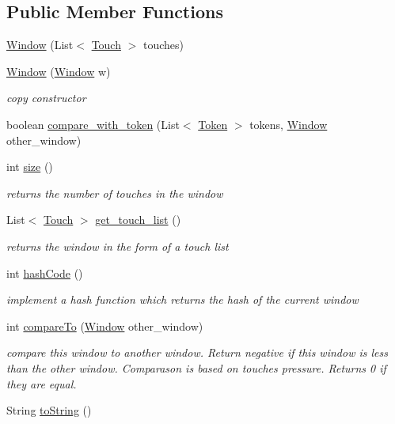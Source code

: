 \subsection*{Public Member Functions}
\begin{DoxyCompactItemize}
\item 
\hyperlink{classcomponents_1_1_window_a7ca5acd9fe649949cb0adccc837cf9d2}{Window} (List$<$ \hyperlink{classcomponents_1_1_touch}{Touch} $>$ touches)
\item 
\hyperlink{classcomponents_1_1_window_a5869fe4e3c5d711af934ff83114e55aa}{Window} (\hyperlink{classcomponents_1_1_window}{Window} w)
\begin{DoxyCompactList}\small\item\em copy constructor \end{DoxyCompactList}\item 
boolean \hyperlink{classcomponents_1_1_window_a3453a892128b5b4bded8bb7d18bbf35f}{compare\+\_\+with\+\_\+token} (List$<$ \hyperlink{classcomponents_1_1_token}{Token} $>$ tokens, \hyperlink{classcomponents_1_1_window}{Window} other\+\_\+window)
\item 
int \hyperlink{classcomponents_1_1_window_ab553fd43fb0240c0ef8a2218bdd5092c}{size} ()
\begin{DoxyCompactList}\small\item\em returns the number of touches in the window \end{DoxyCompactList}\item 
List$<$ \hyperlink{classcomponents_1_1_touch}{Touch} $>$ \hyperlink{classcomponents_1_1_window_abde5cba55b899aca32dd46750aeb4c32}{get\+\_\+touch\+\_\+list} ()
\begin{DoxyCompactList}\small\item\em returns the window in the form of a touch list \end{DoxyCompactList}\item 
int \hyperlink{classcomponents_1_1_window_aa733aef8f3ca04b19cd9fac71096a6ff}{hash\+Code} ()
\begin{DoxyCompactList}\small\item\em implement a hash function which returns the hash of the current window \end{DoxyCompactList}\item 
int \hyperlink{classcomponents_1_1_window_acf98290f4314388936c14de8b259339a}{compare\+To} (\hyperlink{classcomponents_1_1_window}{Window} other\+\_\+window)
\begin{DoxyCompactList}\small\item\em compare this window to another window. Return negative if this window is less than the other window. Comparason is based on touches\textquotesingle{} pressure. Returns 0 if they are equal. \end{DoxyCompactList}\item 
String \hyperlink{classcomponents_1_1_window_ab46581a7a83d26f3f7cbb8ef16cc68fc}{to\+String} ()
\end{DoxyCompactItemize}


